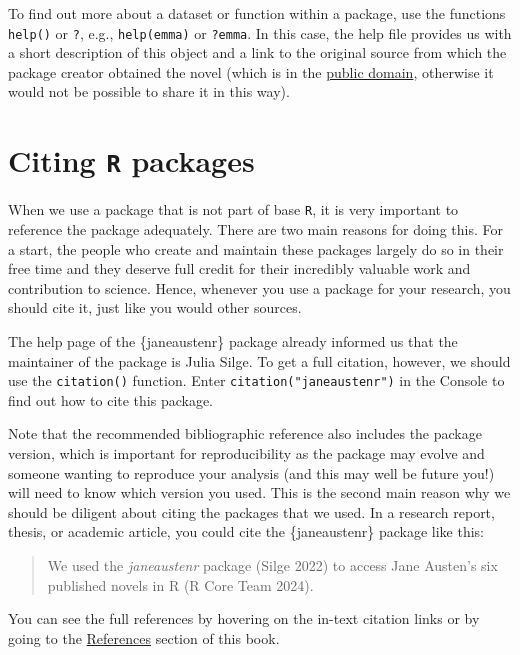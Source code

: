 \documentclass[
  letterpaper,
  DIV=11,
  numbers=noendperiod,
  oneside]{scrreprt}
\begin{document}
To find out more about a dataset or function within a package, use the
functions \texttt{help()} or \texttt{?}, e.g., \texttt{help(emma)} or
\texttt{?emma}. In this case, the help file provides us with a short
description of this object and a link to the original source from which
the package creator obtained the novel (which is in the
\href{https://www.gutenberg.org/help/faq.html\#what-books-does-project-gutenberg-publish}{public
domain}, otherwise it would not be possible to share it in this way).

\section{\texorpdfstring{Citing \texttt{R}
packages}{Citing R packages}}\label{citing-r-packages}

When we use a package that is not part of base \texttt{R}, it is very
important to reference the package adequately. There are two main
reasons for doing this. For a start, the people who create and maintain
these packages largely do so in their free time and they deserve full
credit for their incredibly valuable work and contribution to science.
Hence, whenever you use a package for your research, you should cite it,
just like you would other sources.

The help page of the \{janeaustenr\} package already informed us that
the maintainer of the package is Julia Silge. To get a full citation,
however, we should use the \texttt{citation()} function. Enter
\texttt{citation("janeaustenr")} in the Console to find out how to cite
this package.

Note that the recommended bibliographic reference also includes the
package version, which is important for reproducibility as the package
may evolve and someone wanting to reproduce your analysis (and this may
well be future you!) will need to know which version you used. This is
the second main reason why we should be diligent about citing the
packages that we used. In a research report, thesis, or academic
article, you could cite the \{janeaustenr\} package like this:

\begin{quote}
We used the \emph{janeaustenr} package (Silge 2022) to access Jane
Austen's six published novels in R (R Core Team 2024).
\end{quote}

You can see the full references by hovering on the in-text citation
links or by going to the
\href{https://elenlefoll.github.io/RstatsTextbook/references.html}{References}
section of this book.
\end{document}
